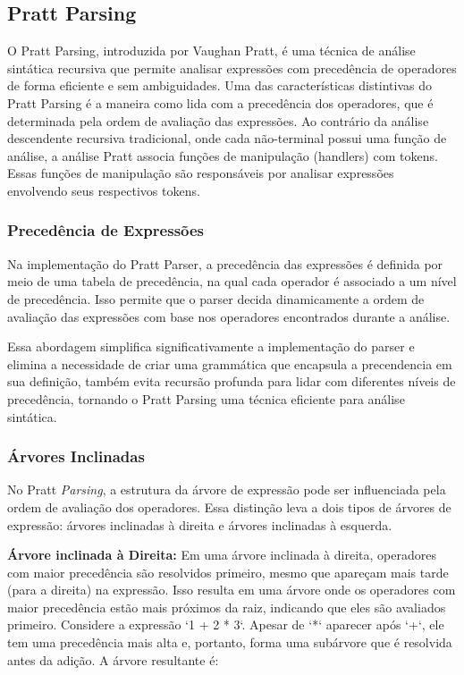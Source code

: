\documentclass[english, 
               brazil, 
               bsc] %
               {dcomp-abntex2}
\begin{document}
\subsection{Pratt Parsing}
O Pratt Parsing, introduzida por Vaughan Pratt, é uma técnica de análise sintática recursiva que permite analisar expressões com precedência de operadores de forma eficiente e sem ambiguidades. Uma das características distintivas do Pratt Parsing é a maneira como lida com a precedência dos operadores, que é determinada pela ordem de avaliação das expressões. Ao contrário da análise descendente recursiva tradicional, onde cada não-terminal possui uma função de análise, a análise Pratt associa funções de manipulação (handlers) com tokens. Essas funções de manipulação são responsáveis por analisar expressões envolvendo seus respectivos tokens.

\subsubsection{Precedência de Expressões}

Na implementação do Pratt Parser, a precedência das expressões é definida por meio de uma tabela de precedência, na qual cada operador é associado a um nível de precedência. Isso permite que o parser decida dinamicamente a ordem de avaliação das expressões com base nos operadores encontrados durante a análise.

Essa abordagem simplifica significativamente a implementação do parser e elimina a necessidade de criar uma grammática que encapsula a precendencia em sua definição, também evita recursão profunda para lidar com diferentes níveis de precedência, tornando o Pratt Parsing uma técnica eficiente para análise sintática.

\subsubsection{Árvores Inclinadas}

No Pratt \textit{Parsing}, a estrutura da árvore de expressão pode ser influenciada pela ordem de avaliação dos operadores. Essa distinção leva a dois tipos de árvores de expressão: árvores inclinadas à direita e árvores inclinadas à esquerda.

\textbf{Árvore inclinada à Direita:} Em uma árvore inclinada à direita, operadores com maior precedência são resolvidos primeiro, mesmo que apareçam mais tarde (para a direita) na expressão. Isso resulta em uma árvore onde os operadores com maior precedência estão mais próximos da raiz, indicando que eles são avaliados primeiro. Considere a expressão `1 + 2 * 3`. Apesar de `*` aparecer após `+`, ele tem uma precedência mais alta e, portanto, forma uma subárvore que é resolvida antes da adição. A árvore resultante é:
\end{document}
